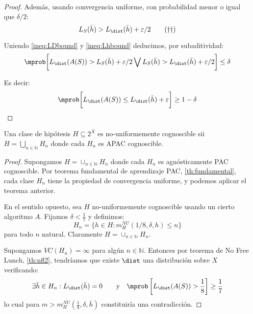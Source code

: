 \begin{proof}
   Además, usando convergencia uniforme, con probabilidad menor o igual que $\delta/2$:
   \begin{equation}
     L_S(\bar{h}) > L_{\dist}(\bar{h}) + \varepsilon/2
     \label{ineq:Lhbound}\tag{\textrm{$\dagger$$\dagger$}}
   \end{equation}

   Uniendo \eqref{ineq:LDbound} y \eqref{ineq:Lhbound} deducimos, por subaditividad:
   \[
     \mprob \bigg[L_{\dist}(A(S)) > L_{S}(\bar{h}) + \varepsilon/2 \bigvee L_S(\bar{h}) > L_{\dist}(\bar{h}) + \varepsilon/2\bigg] \le \delta
   \]
   
   Es decir:
   \[
     \mprob \bigg[L_{\dist}(A(S)) \le L_{\dist}(\bar{h}) + \varepsilon \bigg] \ge 1 - \delta
   \]
  \end{proof}

\begin{theorem}
Una clase de hipótesis $H \subseteq 2^X$ es no-uniformemente cognoscible sii $H = \bigcup_{n\in\mathbb{N}} H_n$ donde
cada $H_n$ es APAC cognoscible.
\end{theorem}
  \begin{proof}
   Supongamos $H = \cup_{n\in \mathbb{N}} H_n$ donde cada $H_n$ es agnósticamente PAC 
   cognoscible. Por teorema fundamental de aprendizaje PAC, \ref{th:fundamental}, cada clase $H_n$ tiene la propiedad de 
   convergencia uniforme, y podemos aplicar el teorema anterior.

   En el sentido opuesto, sea $H$ no-uniformemente cognoscible usando un cierto algoritmo $A$. Fijamos $\delta < \frac{1}{7}$ y
   definimos:
   \[
     H_n = \{h \in H : m_{H}^{NU}(1/8, \delta, h) \le n\}
   \]
   para todo $n$ natural. Claramente $H = \cup_{n\in \mathbb{N}} H_n$. 
   
   Supongamos $VC(H_n) = \infty$ para algún $n\in \mathbb{N}$. Entonces por teorema de No Free Lunch, \ref{th:nfl2}, 
   tendríamos que existe $\dist$ una distribución sobre $X$ verificando:
   \[
     \exists \bar{h}\in H_n: L_{\dist}(\bar{h}) = 0 \qquad\textrm{y}\quad \mprob \left[ L_{\dist}(A(S)) > \frac{1}{8} \right] \ge \frac{1}{7}
   \]
   lo cual para $m > m_H^{NU}(\frac{1}{8}, \delta, \bar{h})$ constituiría una contradicción.
  \end{proof}
  
